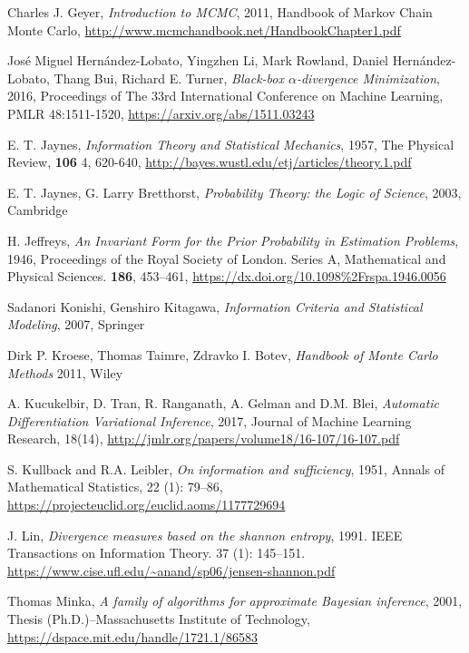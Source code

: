 \documentclass[12pt,vu]{adammath}
\theoremstyle{plain}
\theoremstyle{definition}
\theoremstyle{remark}
\begin{document}
\begin{thebibliography}{xx}
  Charles J. Geyer,
  \emph{Introduction to MCMC},
  2011,
  Handbook of Markov Chain Monte Carlo,
  \url{http://www.mcmchandbook.net/HandbookChapter1.pdf}

  José Miguel Hernández-Lobato, Yingzhen Li, Mark Rowland, Daniel Hernández-Lobato, Thang Bui, Richard E. Turner,
  \emph{Black-box $\alpha$-divergence Minimization},
  2016,
  Proceedings of The 33rd International Conference on Machine Learning, PMLR 48:1511-1520,
  \url{https://arxiv.org/abs/1511.03243}

  E. T. Jaynes,
  \emph{Information Theory and Statistical Mechanics},
  1957,
  The Physical Review, \textbf{106} 4, 620-640,
  \url{http://bayes.wustl.edu/etj/articles/theory.1.pdf}

  E. T. Jaynes, G. Larry Bretthorst,
  \emph{Probability Theory: the Logic of Science},
  2003,
  Cambridge

  H. Jeffreys,
  \emph{An Invariant Form for the Prior Probability in Estimation Problems},
  1946,
  Proceedings of the Royal Society of London. Series A, Mathematical and Physical Sciences. \textbf{186}, 453–461,
  \url{https://dx.doi.org/10.1098%2Frspa.1946.0056}

  Sadanori Konishi, Genshiro Kitagawa,
  \emph{Information Criteria and Statistical Modeling},
  2007,
  Springer

  Dirk P. Kroese, Thomas Taimre, Zdravko I. Botev,
  \emph{Handbook of Monte Carlo Methods}
  2011,
  Wiley

  A. Kucukelbir, D. Tran, R. Ranganath, A. Gelman and D.M. Blei,
  \emph{Automatic Differentiation Variational Inference},
  2017,
  Journal of Machine Learning Research, 18(14),
  \url{http://jmlr.org/papers/volume18/16-107/16-107.pdf}

  S. Kullback and R.A. Leibler,
  \emph{On information and sufficiency},
  1951,
  Annals of Mathematical Statistics, 22 (1): 79–86,
  \url{https://projecteuclid.org/euclid.aoms/1177729694}

  J. Lin,
  \emph{Divergence measures based on the shannon entropy},
  1991.
  IEEE Transactions on Information Theory. 37 (1): 145–151.
  \url{https://www.cise.ufl.edu/~anand/sp06/jensen-shannon.pdf}

  Thomas Minka,
  \emph{A family of algorithms for approximate Bayesian inference},
  2001,
  Thesis (Ph.D.)--Massachusetts Institute of Technology,
  \url{https://dspace.mit.edu/handle/1721.1/86583}


\end{thebibliography}
\end{document}
